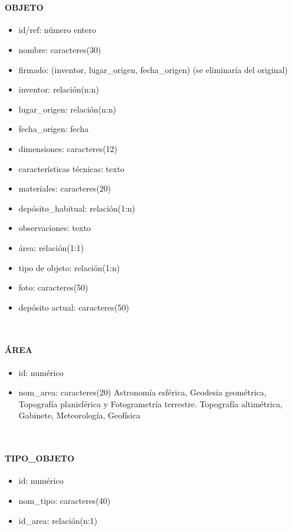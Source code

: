~\paragraph{OBJETO}
\begin{itemize}
\item id/ref: número entero
\item nombre: caracteres(30)
\item firmado: (inventor, lugar\_origen, fecha\_origen) (se eliminaría del original)
\item inventor: relación(n:n)
\item lugar\_origen: relación(n:n)
\item fecha\_origen: fecha
\item dimensiones: caracteres(12)
\item características técnicas: texto
\item materiales: caracteres(20)
\item depósito\_habitual: relación(1:n)
\item observaciones: texto
\item área: relación(1:1)
\item tipo de objeto: relación(1:n)
\item foto: caracteres(50)
\item depósito actual: caracteres(50)
\end{itemize}

~\paragraph{ÁREA}
\begin{itemize}
\item id: numérico
\item nom\_area: caracteres(20)
{Astronomía esférica, Geodesia geométrica, Topografía planisférica y Fotogrametría terrestre.
Topografía altimétrica, Gabinete, Meteorología, Geofísica}
\end{itemize}

~\paragraph{TIPO\_OBJETO}
\begin{itemize}
\item id: numérico
\item nom\_tipo: caracteres(40)
\item id\_area: relación(n:1)
\end{itemize}

